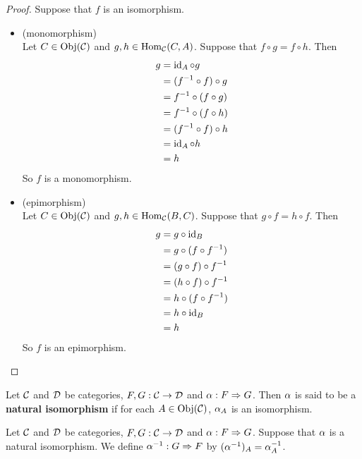 \documentclass{book}
\begin{document}
	\begin{proof}
		Suppose that $f$ is an isomorphism. 
		\begin{itemize}
			\item (monomorphism) \\
			Let $C \in \operatorname{Obj}(\mathcal{C})$ and $g, h \in \operatorname{Hom}_{\mathcal{C}}(C, A)$. Suppose that $f \circ g = f \circ h$. Then
			\begin{align*}
				g 
				& = \operatorname{id}_A \circ g \\
				& = (f^{-1} \circ f) \circ g \\
				& = f^{-1} \circ (f \circ g) \\
				& = f^{-1} \circ (f \circ h) \\
				& = (f^{-1} \circ f) \circ h \\
				& = \operatorname{id}_A \circ h \\
				& = h
			\end{align*}
			So $f$ is a monomorphism.
			\item  (epimorphism) \\
			Let $C \in \operatorname{Obj}(\mathcal{C})$ and $g, h \in \operatorname{Hom}_{\mathcal{C}}(B, C)$. Suppose that $ g \circ f = h \circ f$. Then
			\begin{align*}
				g 
				& = g \circ \operatorname{id}_B \\
				& = g \circ (f \circ f^{-1}) \\
				& = (g \circ f) \circ f^{-1} \\
				& = (h \circ f) \circ f^{-1} \\
				& = h \circ (f \circ f^{-1}) \\
				& = h \circ \operatorname{id}_B \\
				& = h
			\end{align*}
			So $f$ is an epimorphism.
		\end{itemize}
	\end{proof}
	
	\begin{defn} 
		Let $\mathcal{C}$ and $\mathcal{D}$ be categories, $F,G: \mathcal{C} \rightarrow \mathcal{D}$ and $\alpha : F \Rightarrow G$. Then $\alpha$ is said to be a \textbf{natural isomorphism} if for each $A \in \operatorname{Obj}(\mathcal{C})$, $\alpha_A$ is an isomorphism.
	\end{defn}

	\begin{defn} 
		Let $\mathcal{C}$ and $\mathcal{D}$ be categories, $F,G: \mathcal{C} \rightarrow \mathcal{D}$ and $\alpha : F \Rightarrow G$. Suppose that $\alpha$ is a natural isomorphism. We define $\alpha^{-1}: G \Rightarrow F$ by $(\alpha^{-1})_A = \alpha_A^{-1}$. 
	\end{defn}
\end{document}
